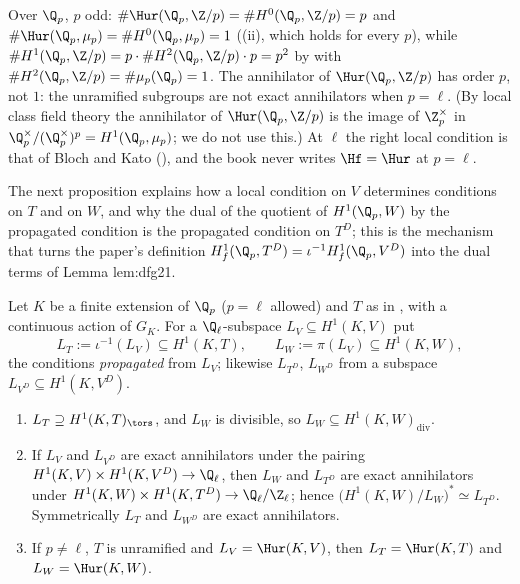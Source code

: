 \begin{warning}[the case $p=\ell$]\label{warn:galcoh:p-equals-l}
Over $\Q_p$, $p$ odd: $\#\Hur(\Q_p,\Z/p)=\#H^0(\Q_p,\Z/p)=p$ and $\#\Hur(\Q_p,\mu_p)=\#H^0(\Q_p,\mu_p)=1$ ((ii), which holds for every
$p$), while $\#H^1(\Q_p,\Z/p)=p\cdot\#H^2(\Q_p,\Z/p)\cdot p=p^2$ by  with $\#H^2(\Q_p,\Z/p)=\#\mu_p(\Q_p)=1$. The annihilator of $\Hur(\Q_p,\Z/p)$ has
order $p$, not $1$: the unramified subgroups are not exact annihilators when $p=\ell$. (By local class field theory the annihilator of $\Hur(\Q_p,\Z/p)$ is the image of
$\Z_p^\times$ in $\Q_p^\times/(\Q_p^\times)^p=H^1(\Q_p,\mu_p)$; we do not use this.) At $\ell$ the right local condition is that of Bloch and Kato (),
and the book never writes $\Hf=\Hur$ at $p=\ell$.
\end{warning}

The next proposition explains how a local condition on $V$ determines conditions on $T$ and on $W$, and why the dual of the quotient of $H^1(\Q_p,W)$ by the
propagated condition is the propagated condition on $T^D$; this is the mechanism that turns the paper's definition $H^1_f(\Q_p,T^D)=\iota^{-1}H^1_f(\Q_p,V^D)$ into the
dual terms of Lemma lem:dfg21.

\begin{proposition}\label{prop:galcoh:propagation}
Let $K$ be a finite extension of $\Q_p$ ($p=\ell$ allowed) and $T$ as in , with a continuous action of $G_K$. For a $\Q_\ell$-subspace
$L_V\subseteq H^1(K,V)$ put
\[
L_T:=\iota^{-1}(L_V)\subseteq H^1(K,T),\qquad L_W:=\pi(L_V)\subseteq H^1(K,W),
\]
the conditions \emph{propagated} from $L_V$; likewise $L_{T^D}$, $L_{W^D}$ from a subspace $L_{V^D}\subseteq H^1(K,V^D)$.
\begin{enumerate}[label=(\roman*)]
\item $L_T\supseteq H^1(K,T)_{\tors}$, and $L_W$ is divisible, so $L_W\subseteq H^1(K,W)_{\mathrm{div}}$.
\item If $L_V$ and $L_{V^D}$ are exact annihilators under the pairing $H^1(K,V)\times H^1(K,V^D)\to\Q_\ell$, then $L_W$ and $L_{T^D}$ are exact annihilators under
$H^1(K,W)\times H^1(K,T^D)\to\Q_\ell/\Z_\ell$; hence $\bigl(H^1(K,W)/L_W\bigr)^*\simeq L_{T^D}$. Symmetrically $L_T$ and $L_{W^D}$ are exact annihilators.
\item If $p\ne\ell$, $T$ is unramified and $L_V=\Hur(K,V)$, then $L_T=\Hur(K,T)$ and $L_W=\Hur(K,W)$.
\end{enumerate}
\end{proposition}

